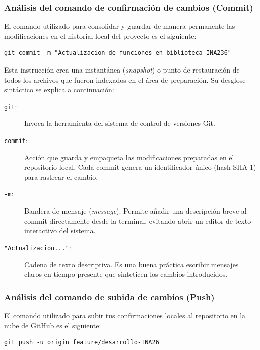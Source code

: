 \documentclass[
10pt, %
a4paper, %
oneside, %
headinclude,footinclude, %
BCOR5mm, %
]{scrartcl}
\begin{document}
\subsubsection{Análisis del comando de confirmación de cambios (Commit)}

El comando utilizado para consolidar y guardar de manera permanente las modificaciones en el historial local del proyecto es el siguiente:
\begin{lstlisting}[style=CMakeStyle]
	git commit -m "Actualizacion de funciones en biblioteca INA236"
\end{lstlisting}

Esta instrucción crea una instantánea (\textit{snapshot}) o punto de restauración de todos los archivos que fueron indexados en el área de preparación. Su desglose sintáctico se explica a continuación:

\begin{description}
	\item[\texttt{git}:] Invoca la herramienta del sistema de control de versiones Git.
	\item[\texttt{commit}:] Acción que guarda y empaqueta las modificaciones preparadas en el repositorio local. Cada commit genera un identificador único (hash SHA-1) para rastrear el cambio.
	\item[\texttt{-m}:] Bandera de mensaje (\textit{message}). Permite añadir una descripción breve al commit directamente desde la terminal, evitando abrir un editor de texto interactivo del sistema.
	\item[\texttt{"Actualizacion..."}:] Cadena de texto descriptiva. Es una buena práctica escribir mensajes claros en tiempo presente que sinteticen los cambios introducidos.
\end{description}

\subsubsection{Análisis del comando de subida de cambios (Push)}

El comando utilizado para subir tus confirmaciones locales al repositorio en la nube de GitHub es el siguiente:
\begin{lstlisting}[style=CMakeStyle]
	git push -u origin feature/desarrollo-INA26
\end{lstlisting}
\end{document}
